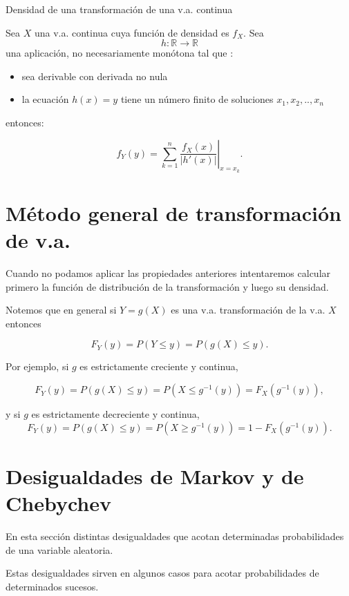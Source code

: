 \documentclass[
  letterpaper,
  DIV=11,
  numbers=noendperiod]{scrreprt}
\providecommand{\tightlist}{%
  \setlength{\itemsep}{0pt}\setlength{\parskip}{0pt}}\usepackage{longtable,booktabs,array}
\begin{document}
\begin{Proposicion}{Densidad de una transformación de una v.a. continua}{}

Sea \(X\) una v.a. continua cuya función de densidad es \(f_{X}\). Sea
\[h:\mathbb{R}\to\mathbb{R}\] una aplicación, no necesariamente monótona
tal que :

\begin{itemize}
\tightlist
\item
  sea derivable con derivada no nula
\item
  la ecuación \(h(x)=y\) tiene un número finito de soluciones
  \(x_1,x_2,..,x_{n}\)
\end{itemize}

entonces:

\[
\displaystyle f_{Y}(y)=\left.\sum_{k=1}^{n} \frac{f_{X}(x)}
{\left|h'(x)\right|}\right|_{x=x_{k}}.
\]

\end{Proposicion}

\section{Método general de transformación de
v.a.}\label{muxe9todo-general-de-transformaciuxf3n-de-v.a.}

Cuando no podamos aplicar las propiedades anteriores intentaremos
calcular primero la función de distribución de la transformación y luego
su densidad.

Notemos que en general si \(Y=g(X)\) es una v.a. transformación de la
v.a. \(X\) entonces

\[
F_{Y}(y)=P(Y\leq y)=P(g(X)\leq y).
\]

Por ejemplo, si \(g\) es estrictamente creciente y continua,

\[
F_{Y}(y)=P(g(X)\leq y)=P(X\leq g^{-1}(y))=F_{X}(g^{-1}(y)),
\]

y si \(g\) es estrictamente decreciente y continua, \[
F_{Y}(y)=P(g(X)\leq y)=P(X\geq g^{-1}(y))=1-F_{X}(g^{-1}(y)).
\]

\section{Desigualdades de Markov y de
Chebychev}\label{desigualdades-de-markov-y-de-chebychev}

En esta sección distintas desigualdades que acotan determinadas
probabilidades de una variable aleatoria.

Estas desigualdades sirven en algunos casos para acotar probabilidades
de determinados sucesos.
\end{document}
